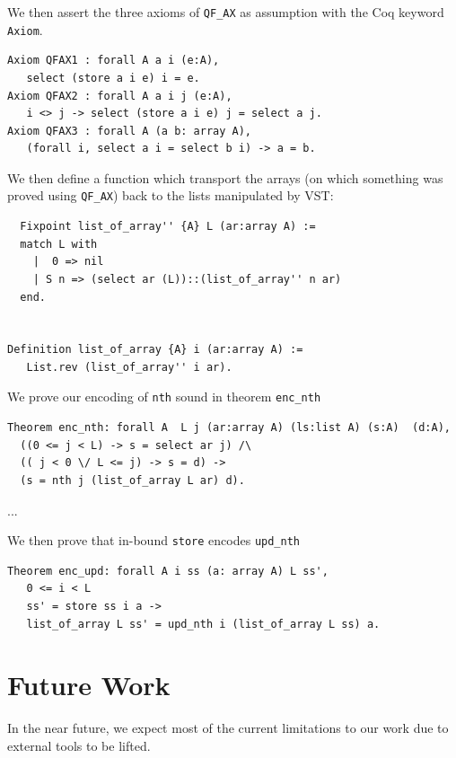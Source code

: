 \documentclass[onecolumn, preprint]{sigplanconf}
\begin{document}
We then assert the three axioms of \lstinline|QF_AX| as assumption with the Coq keyword \lstinline|Axiom|.

\begin{lstlisting}
Axiom QFAX1 : forall A a i (e:A),
   select (store a i e) i = e.  
Axiom QFAX2 : forall A a i j (e:A),
   i <> j -> select (store a i e) j = select a j.  
Axiom QFAX3 : forall A (a b: array A),
   (forall i, select a i = select b i) -> a = b.  
\end{lstlisting}

We then define a function which transport the arrays (on which something was proved using \lstinline|QF_AX|) back to the lists manipulated by VST:

\begin{lstlisting}
  Fixpoint list_of_array'' {A} L (ar:array A) :=
  match L with
    |  0 => nil
    | S n => (select ar (L))::(list_of_array'' n ar)
  end.


Definition list_of_array {A} i (ar:array A) :=
   List.rev (list_of_array'' i ar).
\end{lstlisting}





We prove our encoding of \lstinline|nth| sound in theorem \lstinline|enc_nth|

\begin{lstlisting}
Theorem enc_nth: forall A  L j (ar:array A) (ls:list A) (s:A)  (d:A),
  ((0 <= j < L) -> s = select ar j) /\
  (( j < 0 \/ L <= j) -> s = d) ->
  (s = nth j (list_of_array L ar) d).
\end{lstlisting}

...





We then prove that in-bound \lstinline|store| encodes \lstinline|upd_nth| 

\begin{lstlisting}
Theorem enc_upd: forall A i ss (a: array A) L ss',
   0 <= i < L
   ss' = store ss i a ->
   list_of_array L ss' = upd_nth i (list_of_array L ss) a.
\end{lstlisting}





\section{Future Work}
\label{sec:future}
In the near future, we expect most of the current limitations to our work due to external tools to be lifted.
\end{document}
